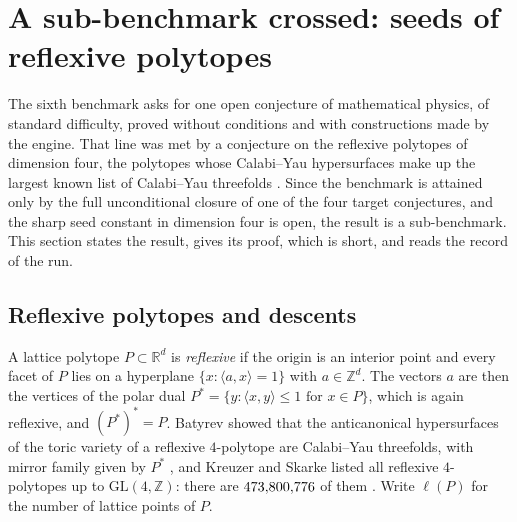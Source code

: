 \section{A sub-benchmark crossed: seeds of reflexive polytopes}\label{sec:seed}

The sixth benchmark asks for one open conjecture of mathematical physics, of standard difficulty, proved without conditions and with constructions made by the engine. That line was met by a conjecture on the reflexive polytopes of dimension four, the polytopes whose Calabi--Yau hypersurfaces make up the largest known list of Calabi--Yau threefolds \cite{Bat94,KS00}. Since the benchmark is attained only by the full unconditional closure of one of the four target conjectures, and the sharp seed constant in dimension four is open, the result is a sub-benchmark. This section states the result, gives its proof, which is short, and reads the record of the run.

\subsection{Reflexive polytopes and descents}\label{ssec:reflexive}

A lattice polytope $P\subset\mathbb{R}^{d}$ is \emph{reflexive} if the origin is an interior point and every facet of $P$ lies on a hyperplane $\{x:\langle a,x\rangle=1\}$ with $a\in\mathbb{Z}^{d}$. The vectors $a$ are then the vertices of the polar dual $P^{*}=\{y:\langle x,y\rangle\le1\text{ for }x\in P\}$, which is again reflexive, and $(P^{*})^{*}=P$. Batyrev showed that the anticanonical hypersurfaces of the toric variety of a reflexive $4$-polytope are Calabi--Yau threefolds, with mirror family given by $P^{*}$ \cite{Bat94}, and Kreuzer and Skarke listed all reflexive $4$-polytopes up to $\mathrm{GL}(4,\mathbb{Z})$: there are $473{,}800{,}776$ of them \cite{KS00}. Write $\ell(P)$ for the number of lattice points of $P$.

